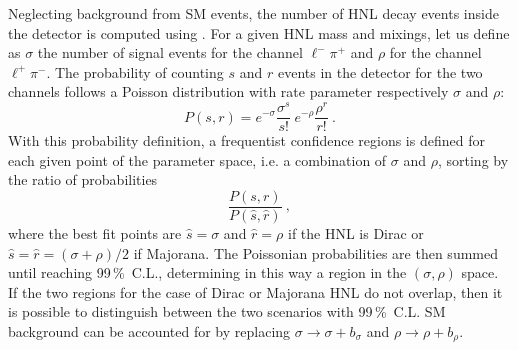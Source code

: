 Neglecting background from SM events, the number of HNL decay events inside the detector is computed %
using .
For a given HNL mass and mixings, let us define as $\sigma$ the number of signal events for the channel $\ell^- \pi^+$ %
and $\rho$ for the channel $\ell^+ \pi^-$.
The probability of counting $s$ and $r$ events in the detector for the two channels %
follows a Poisson distribution with rate parameter respectively $\sigma$ and $\rho$:
\begin{equation}
	P(s, r) = e^{-\sigma} \frac{\sigma^s}{s!}\ e^{-\rho} \frac{\rho^r}{r!}\ .
\end{equation}
With this probability definition, a frequentist confidence regions is defined %
for each given point of the parameter space, i.e. a combination of $\sigma$ and $\rho$, %
sorting by the ratio of probabilities~\cite{Feldman:1997qc} %
\begin{equation}
	\frac{P(s, r)}{P(\hat{s}, \hat{r})}\ ,
\end{equation}
where the best fit points are $\hat{s} = \sigma$ and $\hat{r} = \rho$ if the HNL is Dirac %
or $\hat{s} = \hat{r} = (\sigma + \rho)/2$ if Majorana.
The Poissonian probabilities are then summed until reaching 99\,\%\ C.L., %
determining in this way a region in the $(\sigma, \rho)$ space.
If the two regions for the case of Dirac or Majorana HNL do not overlap, %
then it is possible to distinguish between the two scenarios with 99\,\%\ C.L.
SM background can be accounted for by replacing $\sigma \to \sigma + b_\sigma$ and $\rho \to \rho + b_\rho$.

